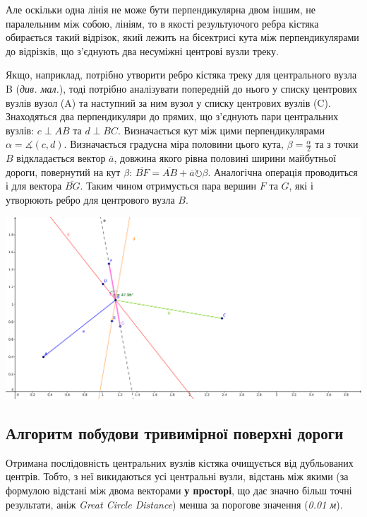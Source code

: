\documentclass[simple,a4paper,14pt,ukrainian,utf8]{eskdtext}
\begin{document}
		Але оскільки одна лінія не може бути перпендикулярна двом іншим, не паралельним між собою, лініям, то в якості результуючого ребра кістяка обирається такий відрізок, який лежить на бісектрисі кута між перпендикулярами до відрізків, що з’єднують два несуміжні центрові вузли треку.
		
		Якщо, наприклад, потрібно утворити ребро кістяка треку для центрального вузла B (\textit{див. мал.}), тоді потрібно аналізувати попередній до нього у списку центрових вузлів вузол (A) та наступний за ним вузол у списку центрових вузлів (C). Знаходяться два перпендикуляри до прямих, що з’єднують пари центральних вузлів: $c \perp AB$ та $d \perp BC$. Визначається кут між цими перпендикулярами $\alpha = \measuredangle(c, d)$. Визначається градусна міра половини цього кута, $\beta = \frac{\alpha}{2}$ та з точки $B$ відкладається вектор $\overline{a}$, довжина якого рівна половині ширини майбутньої дороги, повернутий на кут $\beta$: $\overline{BF} = \overline{AB} + \overline{a} \circlearrowright \beta$. Аналогічна операція проводиться і для вектора $\overline{BG}$. Таким чином отримується пара вершин $F$ та $G$, які і утворюють ребро для центрового вузла $B$.
		
		\vspace{3em}
		\includegraphics[scale=0.65]{images/perpendicular_1_1.png}
	
	\subsection{Алгоритм побудови тривимірної поверхні дороги}
	
		Отримана послідовність центральних вузлів кістяка очищується від дубльованих центрів. Тобто, з неї викидаються усі центральні вузли, відстань між якими (за формулою відстані між двома векторами \textbf{у просторі}, що дає значно більш точні результати, аніж \textit{Great Circle Distance}) менша за порогове значення (\textit{0.01 м}).
		
\end{document}
